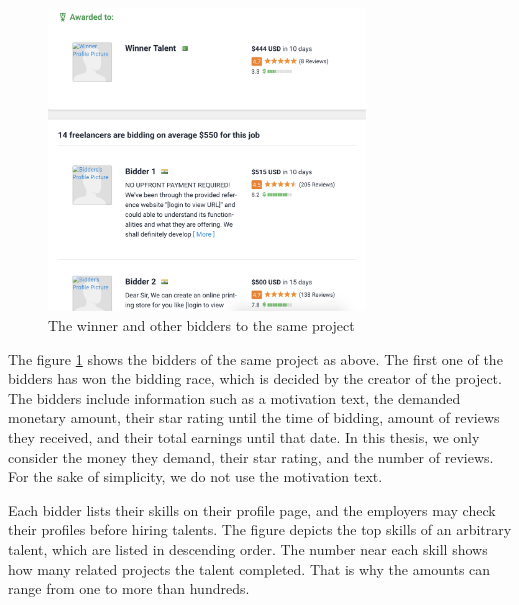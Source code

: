 \begin{figure}[htp]
	\centering
	\includegraphics[width=0.75\textwidth]{figures/FreelancerTalentExample.png}
	\caption{The winner and other bidders to the same project}
	\label{fig:freelancer-example-talent}
\end{figure}


The figure \ref{fig:freelancer-example-talent} shows the bidders of the same project as above. The first one of the bidders has won the bidding race, which is decided by the creator of the project. The bidders include information such as a motivation text, the demanded monetary amount, their star rating until the time of bidding, amount of reviews they received, and their total earnings until that date. In this thesis, we only consider the money they demand, their star rating, and the number of reviews. For the sake of simplicity, we do not use the motivation text.



Each bidder lists their skills on their profile page, and the employers may check their profiles before hiring talents. The figure depicts the top skills of an arbitrary talent, which are listed in descending order. The number near each skill shows how many related projects the talent completed. That is why the amounts can range from one to more than hundreds. 



